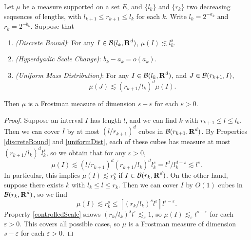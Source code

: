 \begin{theorem} \label{uniformHausdorffResult}
    Let $\mu$ be a measure supported on a set $E$, and $\{ l_k \}$ and $\{ r_k \}$ two decreasing sequences of lengths, with $l_{k+1} \leq r_{k+1} \leq l_k$ for each $k$. Write $l_k = 2^{-a_k}$ and $r_k = 2^{-b_k}$. Suppose that
    \begin{enumerate}
    	\item \label{discreteBound} \emph{(Discrete Bound)}: For any $I \in \operatorname{\mathcal{B}}(l_k,\operatorname{\mathbf{R}}^d)$, $\mu(I) \lesssim l_k^s$.
    	\item \label{controlledScale} \emph{(Hyperdyadic Scale Change)}: $b_k - a_k = o(a_k)$.
    	\item \label{uniformDist} \emph{(Uniform Mass Distribution)}: For any $I \in \operatorname{\mathcal{B}}(l_k,\operatorname{\mathbf{R}}^d)$, and $J \in \operatorname{\mathcal{B}}(r_{k+1},I)$,
    	\[ \mu(J) \lesssim (r_{k+1}/l_k)^d \mu(I). \]
    \end{enumerate}
	Then $\mu$ is a Frostman measure of dimension $s-\varepsilon$ for each $\varepsilon > 0$.
\end{theorem}
\begin{proof}
	Suppose an interval $I$ has length $l$, and we can find $k$ with $r_{k+1} \leq l \leq l_k$. Then we can cover $I$ by at most $(l/r_{k+1})^d$ cubes in $\operatorname{\mathcal{B}}(r_{k+1},\operatorname{\mathbf{R}}^d)$. By Properties \ref{discreteBound} and \ref{uniformDist}, each of these cubes has measure at most $(r_{k+1}/l_k)^d l_k^s$, so we obtain that for any $\varepsilon > 0$,
    \[ \mu(I) \lesssim (l/r_{k+1})^d (r_{k+1}/l_k)^d l_k^s = l^d / l_k^{d-s} \lesssim l^s. \]
    In particular, this implies $\mu(I) \lesssim r_k^s$ if $I \in \operatorname{\mathcal{B}}(r_k,\operatorname{\mathbf{R}}^d)$. On the other hand, suppose there exists $k$ with $l_k \leq l \leq r_k$. Then we can cover $I$ by $O(1)$ cubes in $\operatorname{\mathcal{B}}(r_k,\operatorname{\mathbf{R}}^d)$, so we find
    \[ \mu(I) \lesssim r_k^s \leq [(r_k/l_k)^s l^\varepsilon] l^{s-\varepsilon}. \]
    Property \ref{controlledScale} shows $(r_k/l_k)^s l^\varepsilon \lesssim_\varepsilon 1$, so $\mu(I) \lesssim_\varepsilon l^{s-\varepsilon}$ for each $\varepsilon > 0$. This covers all possible cases, so $\mu$ is a Frostman measure of dimension $s-\varepsilon$ for each $\varepsilon > 0$.
\end{proof}



